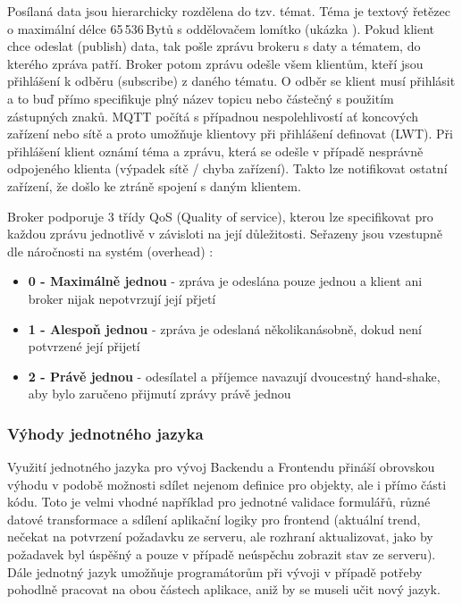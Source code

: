 Posílaná data jsou hierarchicky rozdělena do tzv. témat. Téma je textový řetězec o maximální délce 65\,536\,Bytů s oddělovačem lomítko (ukázka ). Pokud klient chce odeslat (publish) data, tak pošle zprávu brokeru s daty a tématem, do kterého zpráva patří. Broker potom zprávu odešle všem klientům, kteří jsou přihlášení k odběru (subscribe) z daného tématu. O odběr se klient musí přihlásit a to buď přímo specifikuje plný název topicu nebo částečný s použitím zástupných znaků. MQTT počítá s případnou nespolehlivostí ať koncových zařízení nebo sítě a proto umožňuje klientovy při přihlášení definovat  (\hypertarget{LWT}{LWT}). Při přihlášení klient oznámí téma a zprávu, která se odešle v případě nesprávně odpojeného klienta (výpadek sítě / chyba zařízení). Takto lze notifikovat ostatní zařízení, že došlo ke ztráně spojení s daným klientem. \cite{mqtt}

Broker podporuje 3 třídy QoS (Quality of service), kterou lze specifikovat pro každou zprávu jednotlivě v závisloti na její důležitosti. Seřazeny jsou vzestupně dle náročnosti na systém (overhead) \cite{mqtt}:
\begin{itemize}
    \item \textbf{0 - Maximálně jednou} - zpráva je odeslána pouze jednou a klient ani broker nijak nepotvrzují její přjetí
    \item \textbf{1 - Alespoň jednou} - zpráva je odeslaná několikanásobně, dokud není potvrzené její přijetí
    \item \textbf{2 - Právě jednou} - odesílatel a příjemce navazují dvoucestný hand-shake, aby bylo zaručeno přijmutí zprávy právě jednou
\end{itemize}


\subsubsection{Výhody jednotného jazyka}
Využití jednotného jazyka pro vývoj Backendu a Frontendu přináší obrovskou výhodu v podobě možnosti sdílet nejenom definice pro objekty, ale i přímo části kódu. Toto je velmi vhodné například pro jednotné validace formulářů, různé datové transformace a sdílení aplikační logiky pro frontend  (aktuální trend, nečekat na potvrzení požadavku ze serveru, ale rozhraní aktualizovat, jako by požadavek byl úspěšný a pouze v případě neúspěchu zobrazit stav ze serveru). Dále jednotný jazyk umožňuje programátorům při vývoji v případě potřeby pohodlně pracovat na obou částech aplikace, aniž by se museli učit nový jazyk.


